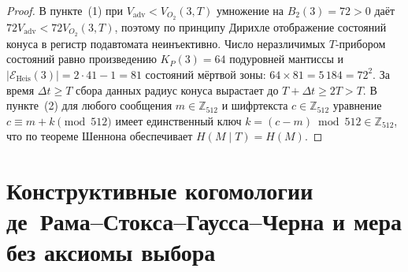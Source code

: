 \begin{proof}
В пункте~(1) при $V_{\mathrm{adv}} < V_{O_2}(3, T)$ умножение на $B_2(3) = 72 > 0$ даёт $72 V_{\mathrm{adv}} < 72 V_{O_2}(3, T)$, поэтому по принципу Дирихле отображение состояний конуса в регистр подавтомата неинъективно. Число неразличимых $T$-прибором состояний равно произведению $K_P(3) = 64$ подуровней мантиссы и $|\mathcal{E}_{\mathrm{Heis}}(3)| = 2\cdot 41 - 1 = 81$ состояний мёртвой зоны: $64 \times 81 = 5\,184 = 72^2$. За время $\Delta t \ge T$ сбора данных радиус конуса вырастает до $T + \Delta t \ge 2T > T$. В пункте~(2) для любого сообщения $m \in \mathbb{Z}_{512}$ и шифртекста $c \in \mathbb{Z}_{512}$ уравнение $c \equiv m + k \pmod{512}$ имеет единственный ключ $k = (c - m) \bmod 512 \in \mathbb{Z}_{512}$, что по теореме Шеннона обеспечивает $H(M \mid T) = H(M)$.
\end{proof}

\section{Конструктивные когомологии де~Рама--Стокса--Гаусса--Черна и мера без аксиомы выбора}

